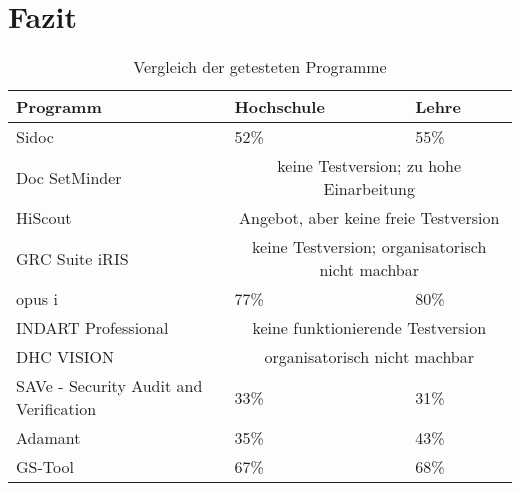 \section{Fazit}

\begin{table}[h!tb]
	\begin{tabular}{|p{}|p{}|p{}|}
		\hline 
		\textbf{Programm} & \textbf{Hochschule} & \textbf{Lehre}\\ 
		\hline
		Sidoc & 52\% & 55\% \\
		\hline 
		Doc SetMinder & \multicolumn{2}{c|}{keine Testversion; zu hohe Einarbeitung}\\
		\hline 
		HiScout & \multicolumn{2}{c|}{Angebot, aber keine freie Testversion} \\
		\hline 
		GRC Suite iRIS & \multicolumn{2}{c|}{keine Testversion; organisatorisch nicht machbar}\\
		\hline 
		opus i & 77\% & 80\% \\
		\hline
		INDART Professional & \multicolumn{2}{c|}{keine funktionierende Testversion} \\
		\hline 
		DHC VISION & \multicolumn{2}{c|}{organisatorisch nicht machbar} \\
		\hline 
		SAVe - Security Audit and Verification & 33\% & 31\% \\
		\hline 
		Adamant & 35\% & 43\%\\
		\hline 
		GS-Tool & 67\% & 68\% \\
		\hline  
		
	\end{tabular} 
	\caption{Vergleich der getesteten Programme}
	\label{tab:programmvergleich}
\end{table}
